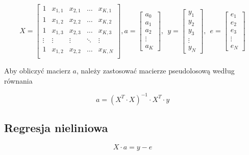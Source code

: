 \begin{equation*}
    X = \begin{bmatrix}
            1 & x_{1,1} & x_{2,1} &\hdots& x_{K,1}\\
            1 & x_{1,2} & x_{2,2} &\hdots& x_{K,2}\\
            1 & x_{1,3} & x_{2,3} &\hdots& x_{K,3}\\
            \vdots & \vdots & \vdots & \ddots & \vdots\\
            1 & x_{1,2} & x_{2,2} &\hdots& x_{K,N}\\
    \end{bmatrix}, 
a = \begin{bmatrix}
    a_0 \\ a_1 \\ a_2 \\ \vdots \\a_K
\end{bmatrix},\ \
y = \begin{bmatrix}
    y_1 \\ y_2 \\ y_3 \\ \vdots \\ y_N
\end{bmatrix},\ \
e = \begin{bmatrix}
    e_1\\e_2\\e_3\\\vdots\\e_N
\end{bmatrix}
\end{equation*}

Aby obliczyć macierz $a$, należy zastosować macierze pseudolosową
według równania

\begin{equation*}
a = ( X^T \cdot X)^{-1} \cdot X^T \cdot y
\end{equation*}

\subsection*{Regresja nieliniowa}

\begin{equation*}
    X \cdot a = y - e
\end{equation*}

